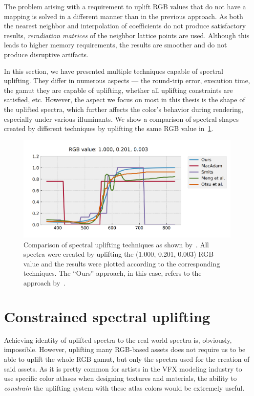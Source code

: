 The problem arising with a requirement to uplift RGB values that do not have a mapping is solved in a different manner than in the previous approach. As both the nearest neighbor and interpolation of coefficients do not produce satisfactory results, \emph{reradiation matrices} of the neighbor lattice points are used. Although this leads to higher memory requirements, the results are smoother and do not produce disruptive artifacts. 

In this section, we have presented multiple techniques capable of spectral uplifting. They differ in numerous aspects --- the round-trip error, execution time, the gamut they are capable of uplifting, whether all uplifting constraints are satisfied, etc. However, the aspect we focus on most in this thesis is the shape of the uplifted spectra, which further affects the color's behavior during rendering, especially under various illuminants. We show a comparison of spectral shapes created by different techniques by uplifting the same RGB value in~\cref{fig:upliftingTechniques}.

\begin{figure}[t!]
	\centering
	\includegraphics[width=0.8\linewidth]{img/upsampling_techniques.png}
	\caption{Comparison of spectral uplifting techniques as shown by~\citet{upsamplingJakobHanika}. All spectra were created by uplifting the (1.000, 0.201, 0.003) RGB value and the results were plotted according to the corresponding techniques. The ``Ours'' approach, in this case, refers to the approach by~\citet{upsamplingJakobHanika}.}
	\label{fig:upliftingTechniques}
\end{figure}

\section{Constrained spectral uplifting}

Achieving identity of uplifted spectra to the real-world spectra is, obviously, impossible. However, uplifting many RGB-based assets does not require us to be able to uplift the whole RGB gamut, but only the spectra used for the creation of said assets. As it is pretty common for artists in the VFX modeling industry to use specific color atlases when designing textures and materials, the ability to \emph{constrain} the uplifting system with these atlas colors would be extremely useful.

